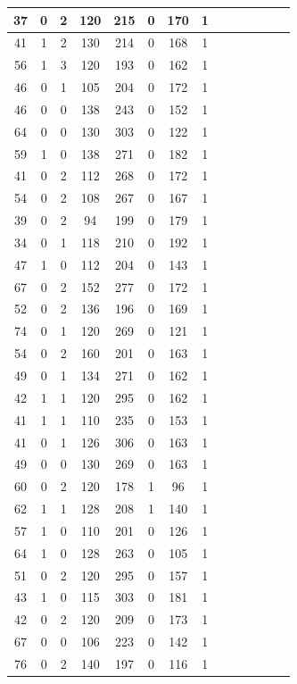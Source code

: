 \documentclass{article}
\begin{document}
\begin{center}
\begin{longtable}{|c|c|c|c|c|c|c|c|c|c|c|c|c|c|}
\hline
37 & 0 & 2 & 120 & 215 & 0 & 170 & 1 \\
\hline
41 & 1 & 2 & 130 & 214 & 0 & 168 & 1 \\
\hline
56 & 1 & 3 & 120 & 193 & 0 & 162 & 1 \\
\hline
46 & 0 & 1 & 105 & 204 & 0 & 172 & 1 \\
\hline
46 & 0 & 0 & 138 & 243 & 0 & 152 & 1 \\
\hline
64 & 0 & 0 & 130 & 303 & 0 & 122 & 1 \\
\hline
59 & 1 & 0 & 138 & 271 & 0 & 182 & 1 \\
\hline
41 & 0 & 2 & 112 & 268 & 0 & 172 & 1 \\
\hline
54 & 0 & 2 & 108 & 267 & 0 & 167 & 1 \\
\hline
39 & 0 & 2 & 94 & 199 & 0 & 179 & 1 \\
\hline
34 & 0 & 1 & 118 & 210 & 0 & 192 & 1 \\
\hline
47 & 1 & 0 & 112 & 204 & 0 & 143 & 1 \\
\hline
67 & 0 & 2 & 152 & 277 & 0 & 172 & 1 \\
\hline
52 & 0 & 2 & 136 & 196 & 0 & 169 & 1 \\
\hline
74 & 0 & 1 & 120 & 269 & 0 & 121 & 1 \\
\hline
54 & 0 & 2 & 160 & 201 & 0 & 163 & 1 \\
\hline
49 & 0 & 1 & 134 & 271 & 0 & 162 & 1 \\
\hline
42 & 1 & 1 & 120 & 295 & 0 & 162 & 1 \\
\hline
41 & 1 & 1 & 110 & 235 & 0 & 153 & 1 \\
\hline
41 & 0 & 1 & 126 & 306 & 0 & 163 & 1 \\
\hline
49 & 0 & 0 & 130 & 269 & 0 & 163 & 1 \\
\hline
60 & 0 & 2 & 120 & 178 & 1 & 96 & 1 \\
\hline
62 & 1 & 1 & 128 & 208 & 1 & 140 & 1 \\
\hline
57 & 1 & 0 & 110 & 201 & 0 & 126 & 1 \\
\hline
64 & 1 & 0 & 128 & 263 & 0 & 105 & 1 \\
\hline
51 & 0 & 2 & 120 & 295 & 0 & 157 & 1 \\
\hline
43 & 1 & 0 & 115 & 303 & 0 & 181 & 1 \\
\hline
42 & 0 & 2 & 120 & 209 & 0 & 173 & 1 \\
\hline
67 & 0 & 0 & 106 & 223 & 0 & 142 & 1 \\
\hline
76 & 0 & 2 & 140 & 197 & 0 & 116 & 1 \\

\end{longtable}
\end{center}
\end{document}
